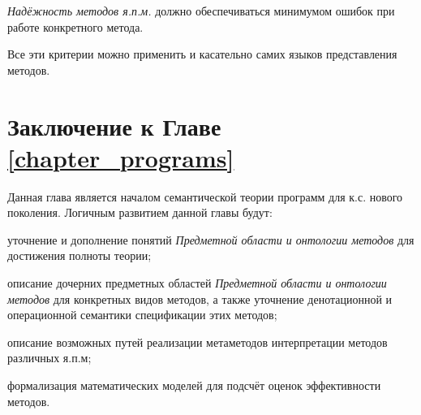 \textit{Надёжность методов я.п.м.} должно обеспечиваться минимумом ошибок при работе конкретного метода.

Все эти критерии можно применить и касательно самих языков представления методов.

\section*{Заключение к Главе \ref{chapter_programs}~}

Данная глава является началом семантической теории программ для к.с. нового поколения. Логичным развитием данной главы будут:

\begin{textitemize}
    \item уточнение и дополнение понятий \textit{Предметной области и онтологии методов} для достижения полноты теории;
    \item описание дочерних предметных областей \textit{Предметной области и онтологии методов} для конкретных видов методов, а также уточнение денотационной и операционной семантики спецификации этих методов;
    \item описание возможных путей реализации метаметодов интерпретации методов различных я.п.м;
    \item формализация математических моделей для подсчёт оценок эффективности методов.
\end{textitemize}
